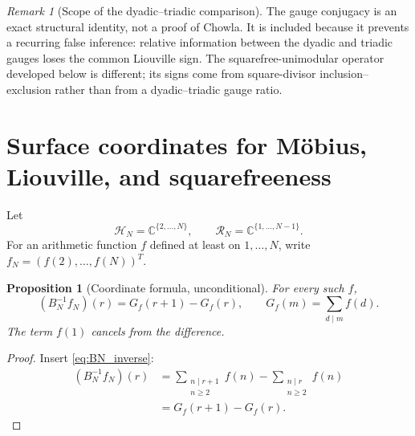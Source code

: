 \documentclass[11pt]{amsart}
\numberwithin{equation}{section}
\theoremstyle{plain}
\newtheorem{proposition}[theorem]{Proposition}
\theoremstyle{definition}
\theoremstyle{remark}
\newtheorem{remark}[theorem]{Remark}
\newcommand{\C}{\mathbb C}
\begin{document}
\begin{remark}[Scope of the dyadic--triadic comparison]
\label{rem:dyadic_triadic_scope}
The gauge conjugacy is an exact structural identity, not a proof of Chowla.  It is included because it prevents a recurring false inference: relative information between the dyadic and triadic gauges loses the common Liouville sign.  The squarefree-unimodular operator developed below is different; its signs come from square-divisor inclusion--exclusion rather than from a dyadic--triadic gauge ratio.
\end{remark}

\section{Surface coordinates for Möbius, Liouville, and squarefreeness}
\label{sec:coordinates}

Let
\begin{equation}
\mathcal H_N=\C^{\{2,\ldots,N\}},
\qquad
\mathcal R_N=\C^{\{1,\ldots,N-1\}}.
\label{eq:finite_spaces}
\end{equation}
For an arithmetic function $f$ defined at least on $1,\ldots,N$, write $f_N=(f(2),\ldots,f(N))^T$.

\begin{proposition}[Coordinate formula, unconditional]
\label{prop:coordinate_formula}
For every such $f$,
\begin{equation}
(B_N^{-1}f_N)(r)=G_f(r+1)-G_f(r),
\qquad
G_f(m)=\sum_{d\mid m}f(d).
\label{eq:coordinate_formula}
\end{equation}
The term $f(1)$ cancels from the difference.
\end{proposition}

\begin{proof}
Insert \eqref{eq:BN_inverse}:
\begin{align}
(B_N^{-1}f_N)(r)
&=\sum_{\substack{n\mid r+1\\n\ge2}}f(n)
-\sum_{\substack{n\mid r\\n\ge2}}f(n)
\label{eq:coordinate_formula_expand}\\
&=G_f(r+1)-G_f(r).
\label{eq:coordinate_formula_finish}
\end{align}
\end{proof}
\end{document}
